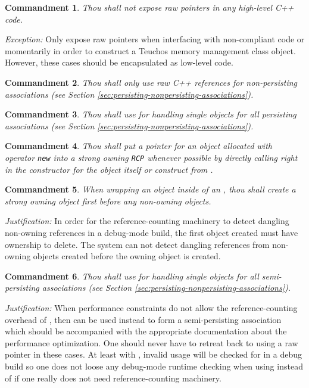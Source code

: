 \documentclass[pdf,ps2pdf,11pt]{SANDreport}
\newtheorem{commandment}{Commandment}
\begin{document}
\begin{commandment}
Thou shall not expose raw pointers in any high-level C++ code.
\end{commandment}

{}\textit{Exception:} Only expose raw pointers when interfacing with
non-compliant code or momentarily in order to construct a Teuchos
memory management class object.  However, these cases should be
encapsulated as low-level code.

\begin{commandment}
Thou shall only use raw C++ references for non-persisting associations
(see Section {}\ref{sec:persisting-nonpersisting-associations}).
\end{commandment}

\begin{commandment}
Thou shall use {} for handling single objects for all
persisting associations (see Section
{}\ref{sec:persisting-nonpersisting-associations}).
\end{commandment}

\begin{commandment}\label{cmnd:rcp-new}
Thou shall put a pointer for an object allocated with operator
{}\texttt{new} into a strong owning {}\texttt{RCP} whenever possible
by directly calling {} right in the constructor for the
{} object itself or construct from {}.
\end{commandment}

\begin{commandment}\label{cmnd:owning-rcp-first}
When wrapping an object inside of an {}, thou shall create
a strong owning {} object first before any non-owning
{} objects.
\end{commandment}
{}\textit{Justification:} In order for the reference-counting
machinery to detect dangling non-owning references in a debug-mode
build, the first {} object created must have ownership to
delete.  The system can not detect dangling references from non-owning
{} objects created before the owning
{} object is created.

\begin{commandment}\label{cmnd:ptr-semi-persisting}
Thou shall use {} for handling single objects for all
semi-persisting associations (see Section
{}\ref{sec:persisting-nonpersisting-associations}).
\end{commandment}
{}\textit{Justification:} When performance constraints do not allow
the reference-counting overhead of {}, then {} can
be used instead to form a semi-persisting association which should be
accompanied with the appropriate documentation about the performance
optimization.  One should never have to retreat back to using a raw
pointer in these cases.  At least with {}, invalid usage will
be checked for in a debug build so one does not loose any debug-mode
runtime checking when using {} instead of {} if one
really does not need reference-counting machinery.
\end{document}
